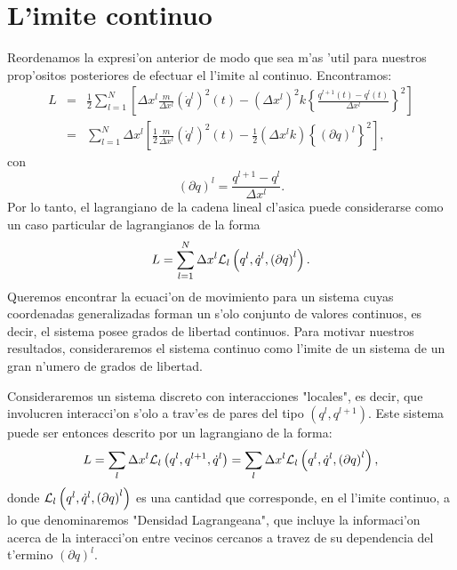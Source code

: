 \section{L'imite continuo}

Reordenamos la expresi'on anterior de modo que sea m'as 'util para nuestros
prop'ositos posteriores de efectuar el l'imite al continuo. Encontramos:
\begin{eqnarray}
L & =  &\frac{1}{2}\sum_{l=1}^{N}\left[ \Delta x^{l}\frac{m}{\Delta
x^{l}}(\dot{q}^{l})^{2}(t) -\left( \Delta x^{l}\right) ^{2}k\left\{
\frac{q^{l+1}(t) -q^{l}(t) }{\Delta x^{l}
}\right\} ^{2}\right] \\
& = &\sum_{l=1}^{N}\Delta x^{l}\left[ \frac{1}{2}\frac{m}{\Delta
x^{l}}(\dot{q}^{l})^{2}(t) -\frac{1}{2}\left( \Delta x^{l}k\right)
\left\{ \left( \partial q \right) ^{l}\right\}^{2}\right] ,
\label{LagrangeanoDiscreto}
\end{eqnarray}
con
\begin{equation}
\left( \partial q\right) ^{l}=\frac{q^{l+1}-q^{l}}{\Delta x^{l}} .
\end{equation}
Por lo tanto, el lagrangiano de la cadena lineal cl'asica puede considerarse
como un caso particular de lagrangianos de la forma
\begin{equation}
L=\sum_{l=1}^{N}\Delta x^{l}{\cal L}_{l}\left( q^{l},\dot{q}^{l},\left(
\partial q\right) ^{l}\right) .\label{Lagrangeano2}
\end{equation}
Queremos encontrar la ecuaci'on de movimiento para un sistema cuyas
coordenadas generalizadas forman un s'olo conjunto de valores
continuos, es decir, el sistema posee grados de libertad continuos. Para motivar
nuestros resultados, consideraremos el sistema continuo como l'imite de un
sistema de un gran n'umero de grados de libertad.

Consideraremos un sistema discreto con interacciones "locales", es decir, que
involucren interacci'on s'olo a trav'es de pares  del tipo $ (q^{l},q^{l+1})$.
Este sistema puede ser entonces descrito por un lagrangiano de la forma:
\begin{equation}
L  =\sum_{l}\Delta x^{l}{\cal L}_{l}\left( q^{l},q^{l+1},\dot{q}^{l}\right)
=\sum_{l}\Delta x^{l}{\cal L}_{l}\left( q^{l},\dot{q}^{l},\left( \partial
q\right) ^{l}\right)  ,
\end{equation}
donde ${\cal L}_{l}\left( q^{l},\dot{q}^{l},\left( \partial q\right)^{l}\right)
$ es una cantidad que corresponde, en el l'imite continuo, a lo que
denominaremos "Densidad Lagrangeana", que incluye la informaci'on acerca de la
interacci'on entre vecinos cercanos a travez de su dependencia del t'ermino
$\left( \partial q\right) ^{l}$.

